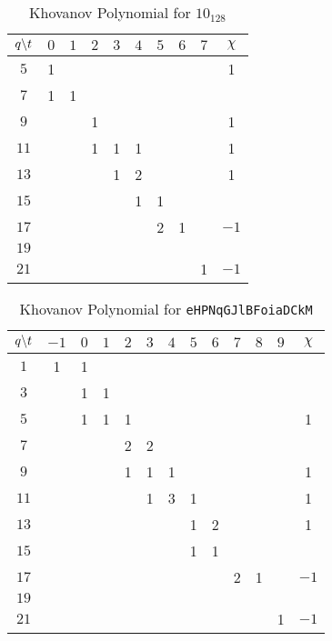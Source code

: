     \begin{table}
        \centering
        \begin{tabular}{| c | c | c | c | c | c | c | c | c | c |}
            \hline
            $q\symbol{92}t$&$0$&$1$&$2$&$3$&$4$&$5$&$6$&$7$&$\chi$\\
            \hline
            $5$&1&&&&&&&&1\\
            \hline
            $7$&1&1&&&&&&&\\
            \hline
            $9$&&&1&&&&&&1\\
            \hline
            $11$&&&1&1&1&&&&1\\
            \hline
            $13$&&&&1&2&&&&1\\
            \hline
            $15$&&&&&1&1&&&\\
            \hline
            $17$&&&&&&2&1&&$-1$\\
            \hline
            $19$&&&&&&&&&\\
            \hline
            $21$&&&&&&&&1&$-1$\\
            \hline
        \end{tabular}
        \caption{Khovanov Polynomial for $10_{128}$}
    \end{table}
    \begin{table}
        \centering
        \begin{tabular}{| c | c | c | c | c | c | c | c | c | c | c | c | c |}
            \hline
            $q\symbol{92}t$&$-1$&$0$&$1$&$2$&$3$&$4$&$5$&$6$&$7$&$8$&$9$&$\chi$\\
            \hline
            $1$&1&1&&&&&&&&&&\\
            \hline
            $3$&&1&1&&&&&&&&&\\
            \hline
            $5$&&1&1&1&&&&&&&&1\\
            \hline
            $7$&&&&2&2&&&&&&&\\
            \hline
            $9$&&&&1&1&1&&&&&&1\\
            \hline
            $11$&&&&&1&3&1&&&&&1\\
            \hline
            $13$&&&&&&&1&2&&&&1\\
            \hline
            $15$&&&&&&&1&1&&&&\\
            \hline
            $17$&&&&&&&&&2&1&&$-1$\\
            \hline
            $19$&&&&&&&&&&&&\\
            \hline
            $21$&&&&&&&&&&&1&$-1$\\
            \hline
        \end{tabular}
        \caption{Khovanov Polynomial for \texttt{eHPNqGJlBFoiaDCkM}}
    \end{table}
